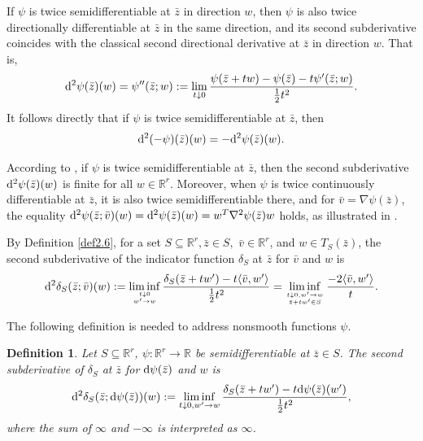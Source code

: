\documentclass[11pt]{article}
\numberwithin{equation}{section}
\newtheorem{definition}{Definition}[section]
\begin{document}
{If $\psi$ is twice semidifferentiable at $\bar{z}$ in direction $w$, then $\psi$ is also twice directionally differentiable at $\bar{z}$ in the same direction, and its second subderivative coincides with the classical second directional derivative at $\bar{z}$ in direction $w$. That is,
 \begin{equation*}{\rm d}^2\psi(\bar z)(w)=\psi''(\bar z; w):=\lim _{t \downarrow 0} \frac{\psi(\bar z+t w)-\psi(\bar z) -t \psi'( \bar z;w)}{\frac{1}{2} t^2}. \label{eqn2.5new}\end{equation*} 
It follows directly that if $\psi$ is twice semidifferentiable at $\bar{z}$, then
 \begin{equation}\label{twice-epi}
{\rm d}^2 (-\psi)(\bar z)(w)=-{\rm d}^2 \psi(\bar z)(w).
 \end{equation}

According to \cite[Exercise 13.7]{RoWe98}, if $\psi$ is twice semidifferentiable at $\bar{z}$, then the second subderivative ${\rm d}^2 \psi(\bar{z})(w)$ is finite for all $w \in \mathbb{R}^r$. Moreover, when $\psi$ is twice continuously differentiable at $\bar{z}$, it is also twice semidifferentiable there, and for $\bar{v} = \nabla \psi(\bar{z})$, the equality
${\rm d}^2 \psi(\bar{z}; \bar{v})(w) = {\rm d}^2 \psi(\bar{z})(w) = w^{T} \nabla^2 \psi(\bar{z}) w$ holds, as illustrated in \cite[Example 13.8]{RoWe98}.


 By Definition \ref{def2.6}, for a set $S \subseteq \mathbb{R}^r, \bar z\in S,$ $\bar v \in \mathbb{R}^r$, and $w \in T_S(\bar z)$, the second subderivative of the indicator function $\delta_S$ at $\bar z$ for
 $\bar v$ and $w$ is
  \begin{equation*}\label{indicator}
\begin{aligned}
 {\rm d}^2\delta_S(\bar z;\bar v)(w):= \liminf\limits_{{t\downarrow 0} \atop {w'\to w}} \frac{\delta_S(\bar{z}+tw')-t\langle \bar{v}, w'\rangle}{\frac{1}{2}t^2}
= \liminf\limits_{{t\downarrow 0,w'\to w} \atop {\bar{z}+tw' \in S}} \frac{-2\langle \bar{v}, w'\rangle}{t}.
\end{aligned}
 \end{equation*}

The following definition is needed to address nonsmooth functions $\psi$.

\begin{definition}\cite[Definition 2.5]{Ma2023}\label{Defn2.7}
Let $S \subseteq \mathbb{R}^r$, $\psi: \mathbb{R}^r \rightarrow \mathbb{R}$ be semidifferentiable at $\bar z \in S$.
 The second subderivative  of $\delta_{S}$ at $\bar z$ for $ {\rm d}\psi(\bar z)$   and $w$ is
$${\rm d}^2 \delta_S(\bar z; {\rm d}\psi(\bar z))(w):= \liminf\limits_{t \downarrow 0, w' \to w} \frac{\delta_{S}(\bar z+tw')-t{\rm d}\psi(\bar z)(w')}{\frac{1}{2}t^2},$$
where the sum of $\infty$ and $-\infty$ is interpreted as $\infty$.
\end{definition}

}
\end{document}
